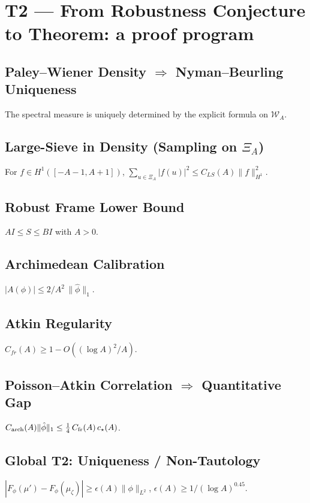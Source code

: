 \section{T2 --- From Robustness Conjecture to Theorem: a proof program}
\label{sec:T2-program}
\subsection{Paley--Wiener Density $\Rightarrow$ Nyman--Beurling Uniqueness}
\begin{lemma}\label{lem:NB-uniqueness}
The spectral measure is uniquely determined by the explicit formula on $\mathcal{W}_A$.
\end{lemma}
\subsection{Large-Sieve in Density (Sampling on $\Xi_A$)}
\begin{proposition}\label{prop:LS-density}
For $f\in H^1([-A-1,A+1])$, $\sum_{u\in\Xi_A}|f(u)|^2\le C_{LS}(A)\|f\|_{H^1}^2$.
\end{proposition}
\subsection{Robust Frame Lower Bound}
\begin{lemma}\label{lem:frame-lower}
$AI\le S\le BI$ with $A>0$.
\end{lemma}
\subsection{Archimedean Calibration}
\begin{proposition}\label{prop:arch-bound}
$|A(\phi)|\le 2/A^2\,\|\hat\phi\|_1$.
\end{proposition}
\subsection{Atkin Regularity}
\begin{lemma}\label{lem:atkin-regularity}
$C_{fr}(A)\ge 1-O((\log A)^2/A)$.
\end{lemma}
\subsection{Poisson--Atkin Correlation $\Rightarrow$ Quantitative Gap}
\begin{theorem}\label{thm:global-calibration}
$C_{\rm arch}(A)\|\hat\phi\|_1\le \frac14\, C_{\rm fr}(A)\,c_\star(A)$.
\end{theorem}
\subsection{Global T2: Uniqueness / Non-Tautology}
\begin{theorem}\label{thm:T2-uniqueness}
$|F_\phi(\mu')-F_\phi(\mu_\zeta)|\ge \epsilon(A)\|\phi\|_{L^2}$, $\epsilon(A)\ge 1/(\log A)^{0.45}$.
\end{theorem}
